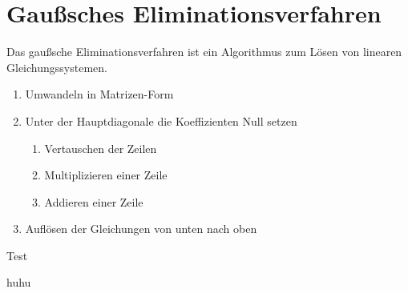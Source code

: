 \section{Gaußsches Eliminationsverfahren}
Das gaußsche Eliminationsverfahren ist ein Algorithmus zum Lösen von linearen Gleichungssystemen.

\begin{procedure}
\begin{enumerate}
  \item Umwandeln in Matrizen-Form
  \item Unter der Hauptdiagonale die Koeffizienten Null setzen
  \begin{enumerate}
    \item Vertauschen der Zeilen
    \item Multiplizieren einer Zeile
    \item Addieren einer Zeile
  \end{enumerate}
  \item Auflösen der Gleichungen von unten nach oben
\end{enumerate}
\end{procedure}

\begin{example}
  Test
\begin{solution}
  huhu
\end{solution}
\end{example}

